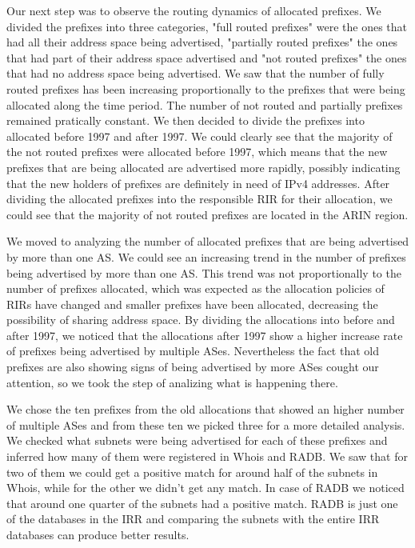 \documentclass[11pt,a4paper]{scrreprt}
\begin{document}
Our next step was to observe the routing dynamics of allocated prefixes. We divided the prefixes into three categories, "full routed prefixes" were the ones that had all their address space being advertised, "partially routed prefixes" the ones that had part of their address space advertised and "not routed prefixes" the ones that had no address space being advertised. We saw that the number of fully routed prefixes has been increasing proportionally to the prefixes that were being allocated along the time period. The number of not routed and partially prefixes remained pratically constant. We then decided to divide the prefixes into allocated before 1997 and after 1997. We could clearly see that the majority of the not routed prefixes were allocated before 1997, which means that the new prefixes that are being allocated are advertised more rapidly, possibly indicating that the new holders of prefixes are definitely in need of IPv4 addresses. After dividing the allocated prefixes into the responsible RIR for their allocation, we could see that the majority of not routed prefixes are located in the ARIN region.

We moved to analyzing the number of allocated prefixes that are being advertised by more than one AS. We could see an increasing trend in the number of prefixes being advertised by more than one AS. This trend was not proportionally to the number of prefixes allocated, which was expected as the allocation policies of RIRs have changed and smaller prefixes have been allocated, decreasing the possibility of sharing address space. By dividing the allocations into before and after 1997, we noticed that the allocations after 1997 show a higher increase rate of prefixes being advertised by multiple ASes. Nevertheless the fact that old prefixes are also showing signs of being advertised by more ASes cought our attention, so we took the step of analizing what is happening there.

We chose the ten prefixes from the old allocations that showed an higher number of multiple ASes and from these ten we picked three for a more detailed analysis. We checked what subnets were being advertised for each of these prefixes and inferred how many of them were registered in Whois and RADB. We saw that for two of them we could get a positive match for around half of the subnets in Whois, while for the other we didn't get any match. In case of RADB we noticed that around one quarter of the subnets had a positive match. RADB is just one of the databases in the IRR and comparing the subnets with the entire IRR databases can produce better results.
\end{document}
